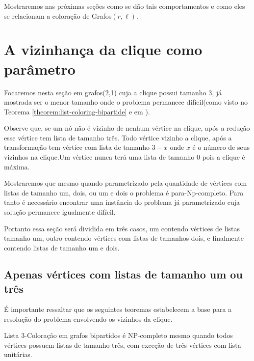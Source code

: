 Mostraremos nas próximas seções como se dão tais comportamentos e como eles se relacionam a coloração de Grafos$(r,\ell)$.

\section{A vizinhança da clique como parâmetro}

Focaremos nesta seção em grafos(2,1) cuja a clique possui tamanho 3, já mostrada ser o menor tamanho onde o problema permanece difícil(como visto no Teorema \ref{theorem:list-coloring-bipartide} e em \cite{kratochvil94,hujter93}).

 Observe que, se um nó não é vizinho de nenhum vértice na clique, após a redução esse vértice tem lista de tamanho três. Todo vértice vizinho a clique, após a transformação tem vértice com lista de tamanho $3-x$ onde $x$ é o número de seus vizinhos na clique.Um vértice nunca terá uma lista de tamanho 0 pois a clique é máxima. 

Mostraremos que mesmo quando parametrizado pela quantidade de vértices com listas de tamanho um, dois, ou um e dois o problema é para-Np-completo. Para tanto é necessário encontrar uma instância do problema já parametrizado cuja solução permanece igualmente difícil.

Portanto essa seção será dividida em três casos, um contendo vértices de listas tamanho um, outro contendo vértices com listas de tamanhos dois, e finalmente contendo listas de tamanho um e dois.


\subsection{Apenas vértices com listas de tamanho um ou três}

É importante ressaltar que os seguintes teoremas estabelecem a base para a resolução do problema envolvendo os vizinhos da clique. 

\begin{teorema}\label{teorema:6-v-np}
Lista 3-Coloração em grafos bipartidos é NP-completo mesmo quando todos vértices possuem listas de tamanho três, com exceção de três vértices com lista unitárias.
\end{teorema}

